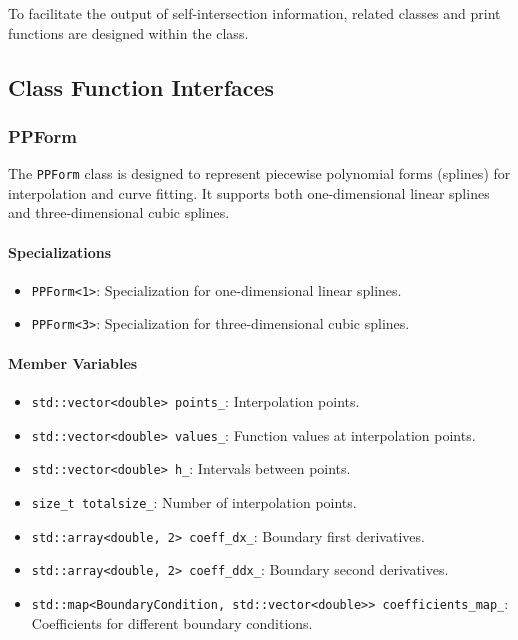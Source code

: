 \documentclass[a4paper]{article}
\begin{document}
\begin{sloppypar}
To facilitate the output of self-intersection information, related classes and print functions are designed within the class.

\subsection{Class Function Interfaces}
\subsubsection{PPForm}
The \verb|PPForm| class is designed to represent piecewise polynomial forms (splines) for interpolation and curve fitting. It supports both one-dimensional linear splines and three-dimensional cubic splines.

\paragraph*{Specializations}
\begin{itemize}
  \item \verb|PPForm<1>|: Specialization for one-dimensional linear splines.
  \item \verb|PPForm<3>|: Specialization for three-dimensional cubic splines.
\end{itemize}

\paragraph*{Member Variables}
\begin{itemize}
  \item \verb|std::vector<double> points_|: Interpolation points.
  \item \verb|std::vector<double> values_|: Function values at interpolation points.
  \item \verb|std::vector<double> h_|: Intervals between points.
  \item \verb|size_t totalsize_|: Number of interpolation points.
  \item \verb|std::array<double, 2> coeff_dx_|: Boundary first derivatives.
  \item \verb|std::array<double, 2> coeff_ddx_|: Boundary second derivatives.
  \item \verb|std::map<BoundaryCondition, std::vector<double>> coefficients_map_|: Coefficients for different boundary conditions.
\end{itemize}


\end{sloppypar}
\end{document}
